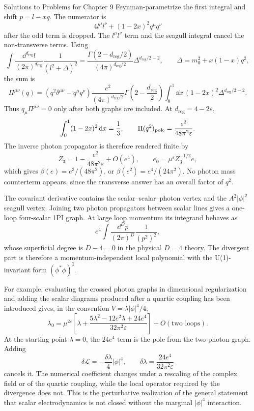 \begin{bankssolutions}{Solutions to Problems for Chapter 9}
Feynman-parametrize the first integral and shift $p=l-xq$.  The numerator is
\[
 4l^\mu l^\nu+(1-2x)^2q^\mu q^\nu
\]
after the odd term is dropped.  The $l^\mu l^\nu$ term and the seagull
integral cancel the non-transverse terms.  Using
\[
 \int\frac{\dd^{d_{\mathrm{reg}}}l}{(2\pi)^{d_{\mathrm{reg}}}}
 \frac1{(l^2+\Delta)^2}
 =\frac{\Gamma(2-d_{\mathrm{reg}}/2)}{(4\pi)^{d_{\mathrm{reg}}/2}}
 \Delta^{d_{\mathrm{reg}}/2-2},
 \qquad \Delta=m_0^2+x(1-x)q^2,
\]
the sum is
\begin{equation}
 \Pi^{\mu\nu}(q)=
 (q^2\delta^{\mu\nu}-q^\mu q^\nu)
 \frac{e^2}{(4\pi)^{d_{\mathrm{reg}}/2}}
 \Gamma\!\left(2-\frac {d_{\mathrm{reg}}}{2}\right)
 \int_0^1\dd x\,(1-2x)^2\Delta^{d_{\mathrm{reg}}/2-2}.
 \label{eq:9.4-sol-pi}
\end{equation}
Thus $q_\mu\Pi^{\mu\nu}=0$ only after both graphs are included.  At
$d_{\mathrm{reg}}=4-2\varepsilon$,
\[
 \int_0^1(1-2x)^2\mathop{}\!\mathrm{d} x=\frac13,
 \qquad
 \Pi(q^2)_{\rm pole}=\frac{e^2}{48\pi^2\varepsilon}.
\]
The inverse photon propagator is therefore rendered finite by
\[
 Z_3=1-\frac{e^2}{48\pi^2\varepsilon}+O(e^4),
 \qquad
 e_0=\mu^\varepsilon Z_3^{-1/2}e,
\]
which gives $\beta(e)=e^3/(48\pi^2)$, or
$\beta(e^2)=e^4/(24\pi^2)$.  No photon mass counterterm appears, since the
transverse answer has an overall factor of $q^2$.

The covariant derivative contains the scalar--scalar--photon vertex and the
$A^2|\phi|^2$ seagull vertex.  Joining two photon propagators between scalar
lines gives a one-loop four-scalar 1PI graph.  At large loop momentum its
integrand behaves as
\[
e^4\int\frac{\dd^D p}{(2\pi)^D}\frac{1}{(p^2)^2},
\]
whose superficial degree is $D-4=0$ in the physical $D=4$ theory.  The
divergent part is
therefore a momentum-independent local polynomial with the U(1)-invariant
form $(\phi^*\phi)^2$.

For example, evaluating the crossed photon graphs in dimensional
regularization and adding the scalar diagrams produced after a quartic
coupling has been introduced gives, in the convention
$V=\lambda|\phi|^4/4$,
\[
 \lambda_0=\mu^{2\varepsilon}\left[
 \lambda+\frac{5\lambda^2-12e^2\lambda+24e^4}
 {32\pi^2\varepsilon}\right]+O(\text{two loops}).
\]
At the starting point $\lambda=0$, the $24e^4$ term is the pole from the
two-photon graph.  Adding
\[
 \delta\mathcal L=-\frac{\delta\lambda}{4}|\phi|^4,
 \qquad
 \delta\lambda=\frac{24e^4}{32\pi^2\varepsilon}
\]
cancels it.  The numerical coefficient changes under a rescaling of the
complex field or of the quartic coupling, while the local operator required
by the divergence does not.  This is the perturbative realization of the
general statement that scalar electrodynamics is not closed without the
marginal $|\phi|^4$ interaction.


\end{bankssolutions}
